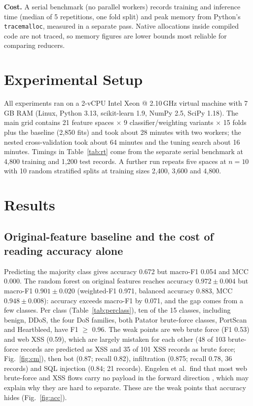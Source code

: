 \documentclass{ieeeaccess}
\begin{document}
\textbf{Cost.} A serial benchmark (no parallel workers) records training and inference time (median of 5 repetitions, one fold split) and peak memory from Python's \texttt{tracemalloc}, measured in a separate pass. Native allocations inside compiled code are not traced, so memory figures are lower bounds most reliable for comparing reducers.

\section{Experimental Setup}
All experiments ran on a 2-vCPU Intel Xeon @ 2.10\,GHz virtual machine with 7\,GB RAM (Linux, Python 3.13, scikit-learn 1.9, NumPy 2.5, SciPy 1.18). The main grid contains 21 feature spaces $\times$ 9 classifier/weighting variants $\times$ 15 folds plus the baseline (2{,}850 fits) and took about 28 minutes with two workers; the nested cross-validation took about 64 minutes and the tuning search about 16 minutes. Timings in Table~\ref{tab:rt} come from the separate serial benchmark at 4{,}800 training and 1{,}200 test records. A further run repeats five spaces at $n=10$ with 10 random stratified splits at training sizes 2{,}400, 3{,}600 and 4{,}800.

\section{Results}
\subsection{Original-feature baseline and the cost of reading accuracy alone}
Predicting the majority class gives accuracy 0.672 but macro-F1 0.054 and MCC 0.000. The random forest on original features reaches accuracy $0.972\pm0.004$ but macro-F1 $0.901\pm0.020$ (weighted-F1 0.971, balanced accuracy 0.883, MCC $0.948\pm0.008$): accuracy exceeds macro-F1 by 0.071, and the gap comes from a few classes. Per class (Table~\ref{tab:perclass}), ten of the 15 classes, including benign, DDoS, the four DoS families, both Patator brute-force classes, PortScan and Heartbleed, have F1 $\ge$ 0.96. The weak points are web brute force (F1 0.53) and web XSS (0.59), which are largely mistaken for each other (48 of 103 brute-force records are predicted as XSS and 35 of 101 XSS records as brute force; Fig.~\ref{fig:cm}), then bot (0.87; recall 0.82), infiltration (0.875; recall 0.78, 36 records) and SQL injection (0.84; 21 records). Engelen et al.\ find that most web brute-force and XSS flows carry no payload in the forward direction \cite{engelen2021}, which may explain why they are hard to separate. These are the weak points that accuracy hides (Fig.~\ref{fig:acc}).
\end{document}
